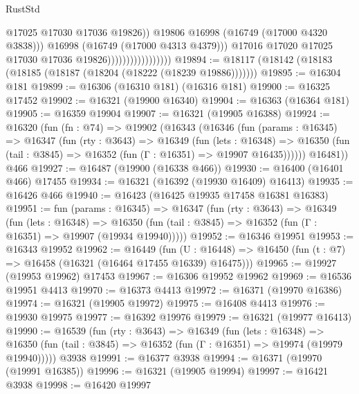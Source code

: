 \begin{lexlean}{RustStd}
\begin{coremodule}
                                              @17025
                                              @17030
                                              @17036
                                              @19826))
                                          @19806
                                          @16998
                                          (@16749 (@17000 @4320 @3838)))
                                        @16998
                                        (@16749 (@17000 @4313 @4379)))
                                      @17016
                                      @17020
                                      @17025
                                      @17030
                                      @17036
                                      @19826)))))))))))))))))
@19894 := @18117 (@18142 (@18183 (@18185 (@18187 (@18204 (@18222 (@18239 @19886)))))))
@19895 := @16304 @181
@19899 := @16306 (@16310 @181) (@16316 @181)
@19900 := @16325 @17452
@19902 := @16321 (@19900 @16340)
@19904 := @16363 (@16364 @181)
@19905 := @16359 @19904
@19907 := @16321 (@19905 @16388)
@19924 := @16320
    (fun (fn : @74) =>
    @19902
      (@16343
        (@16346
          (fun (params : @16345) =>
          @16347
            (fun (rty : @3643) =>
            @16349
              (fun (lets : @16348) =>
              @16350 (fun (tail : @3845) => @16352 (fun (Γ : @16351) => @19907 @16435))))))
        @16481))
    @466
@19927 := @16487 (@19900 (@16338 @466))
@19930 := @16400 (@16401 @466) @17455
@19934 := @16321 (@16392 (@19930 @16409) @16413)
@19935 := @16426 @466
@19940 := @16423 (@16425 @19935 @17458 @16381 @16383)
@19951 := fun (params : @16345) =>
  @16347
    (fun (rty : @3643) =>
    @16349
      (fun (lets : @16348) =>
      @16350 (fun (tail : @3845) => @16352 (fun (Γ : @16351) => @19907 (@19934 @19940)))))
@19952 := @16346 @19951
@19953 := @16343 @19952
@19962 := @16449
    (fun (U : @16448) => @16450 (fun (t : @7) => @16458 (@16321 (@16464 @17455 @16339) @16475)))
@19965 := @19927 (@19953 @19962) @17453
@19967 := @16306 @19952 @19962
@19969 := @16536 @19951 @4413
@19970 := @16373 @4413
@19972 := @16371 (@19970 @16386)
@19974 := @16321 (@19905 @19972)
@19975 := @16408 @4413
@19976 := @19930 @19975
@19977 := @16392 @19976
@19979 := @16321 (@19977 @16413)
@19990 := @16539
    (fun (rty : @3643) =>
    @16349
      (fun (lets : @16348) =>
      @16350 (fun (tail : @3845) => @16352 (fun (Γ : @16351) => @19974 (@19979 @19940)))))
    @3938
@19991 := @16377 @3938
@19994 := @16371 (@19970 (@19991 @16385))
@19996 := @16321 (@19905 @19994)
@19997 := @16421 @3938
@19998 := @16420 @19997

\end{coremodule}
\end{lexlean}
